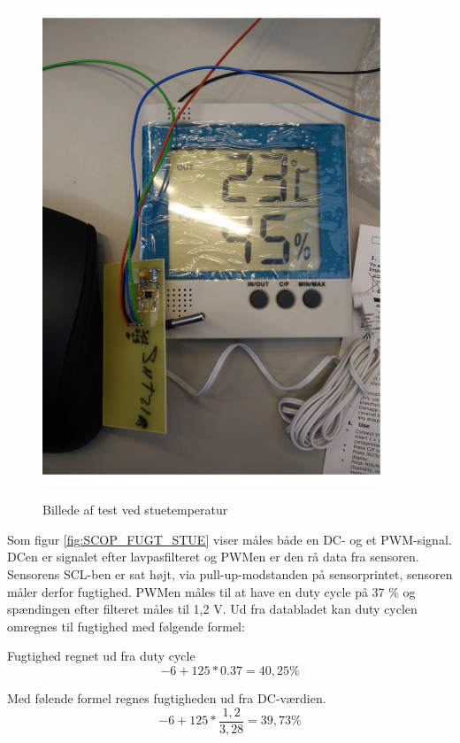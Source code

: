 \begin{figure}[H]
\centering
{\includegraphics[width=0.90\textwidth]{filer/modultest/Billeder/test_STUE}}
\caption{Billede af test ved stuetemperatur}
\label{lab:TEST_STUE}
\end{figure}



Som figur \ref{fig:SCOP_FUGT_STUE} viser måles både en DC- og et PWM-signal. DCen er signalet efter lavpasfilteret og PWMen er den rå data fra sensoren. 
Sensorens SCL-ben er sat højt, via pull-up-modstanden på sensorprintet, sensoren måler derfor fugtighed. PWMen måles til at have en duty cycle på 37 \% og spændingen efter filteret måles til 1,2 V. Ud fra databladet kan duty cyclen omregnes til fugtighed med følgende formel:

Fugtighed regnet ud fra duty cycle
\begin{equation}
-6+125*0.37=40,25\%
\end{equation}

Med følende formel regnes fugtigheden ud fra DC-værdien.
\begin{equation}
-6+125*\frac{1,2}{3,28}= 39,73\%
\end{equation}

